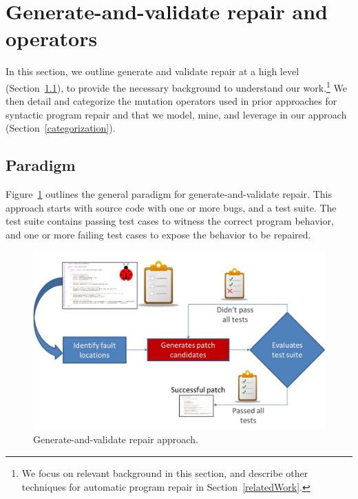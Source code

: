 \documentclass[conference]{IEEEtran}
\begin{document}
\section{Generate-and-validate repair and operators} 
\label{background}

In this section, we outline generate and validate repair at a high level
(Section~\ref{sec-paradigm}), to provide the necessary background to understand our
work.\footnote{We focus on relevant background in this section, and describe
  other techniques for automatic program repair in Section~\ref{relatedWork}.}
  We then detail and categorize the mutation operators used in prior approaches
  for syntactic program repair and that we model, mine, and leverage in our approach
(Section~\ref{categorization}).  
 
 
\subsection{Paradigm}
\label{sec-paradigm}


Figure~\ref{fig:generateandvalidate} outlines the general paradigm for generate-and-validate repair. This approach starts with source code with one or more bugs, and a test suite. The test suite contains passing
test cases to witness the correct program behavior, and one or more failing test 
cases to expose the behavior to be repaired.

\begin{figure}[!h]
  \centering
    \includegraphics[width=\columnwidth]{Picture1}
  \caption{Generate-and-validate repair approach.}
  \label{fig:generateandvalidate}
\end{figure}
\end{document}
